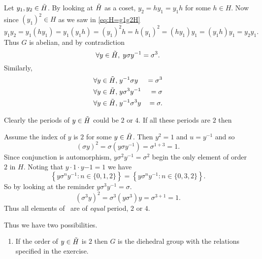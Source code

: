 \documentclass[12pt]{book}
\newcounter{myenumi}
\newenvironment{myenumerate}
{\begin{enumerate}
 \setcounter{enumi}{\themyenumi}
}
{\setcounter{myenumi}{\theenumi}
 \end{enumerate}}
\begin{document}
\begin{myenumerate}
Let \(y_1,y_2\in \tilde{H}\). By looking at \(\tilde{H}\) as a coset,
\(y_2 = h y_1 = y_1 h\) for some \(h\in H\).
Now since \((y_1)^2\in H\) as we saw in \eqref{eq:H=g1g2H}
\begin{equation*}
y_1 y_2 = y_1 (h y_1) = y_1 (y_1 h) = (y_1)^2 h = h (y_1)^2 = (h y_1)y_1
= (y_1 h) y_1 = y_2 y_1.
\end{equation*}
Thus $G$ is abelian, and by contradiction
\begin{equation*}
\forall y\in \tilde{H},\; y\sigma y^{-1}=\sigma^3.
\end{equation*}
Similarly,
\begin{eqnarray*}
\forall y\in \tilde{H},\; & y^{-1}\sigma y &= \sigma^3 \\
\forall y\in \tilde{H},\; & y\sigma^3 y^{-1} &= \sigma \\
\forall y\in \tilde{H},\; & y^{-1}\sigma^3 y &= \sigma.
\end{eqnarray*}

Clearly the periods of \(y\in \tilde{H}\) could be $2$ or $4$.
If all these periods are $2$ then

Assume the index of $y$ is $2$ for some \(y\in\tilde{H}\).
Then \(y^2=1\) and \(u=y^{-1}\) and so
\begin{equation*}
(\sigma y)^2 = \sigma(y \sigma y^{-1}) = \sigma^{1+3}=1.
\end{equation*}
Since conjunction is automorphism, \(y\sigma^2 y^{-1} = \sigma^2\)
begin the only element of order $2$ in $H$.
Noting that \(y\cdot 1 \cdot y{-1} = 1\)
we have
\begin{equation*}
\left\{y\sigma^n y^{-1}: n\in\{0,1,2\}\right\}
=
\left\{y\sigma^n y^{-1}: n\in\{0,3,2\}\right\}.
\end{equation*}
So by looking at the reminder
\(y\sigma^3 y^{-1} = \sigma\).
\begin{equation*}
(\sigma^3 y)^2 = \sigma^3 (y \sigma^3) y = \sigma^{3+1} = 1.
\end{equation*}
Thus all elements of \coH\ are of \emph{equal} period, $2$ or $4$.

Thus we have two possibilities.
\begin{enumerate}

\item If the order of \(y\in\tilde{H}\) is $2$ then $G$ is the diehedral group
with the relations specified in the exercise.


\end{enumerate}
\end{myenumerate}
\end{document}
